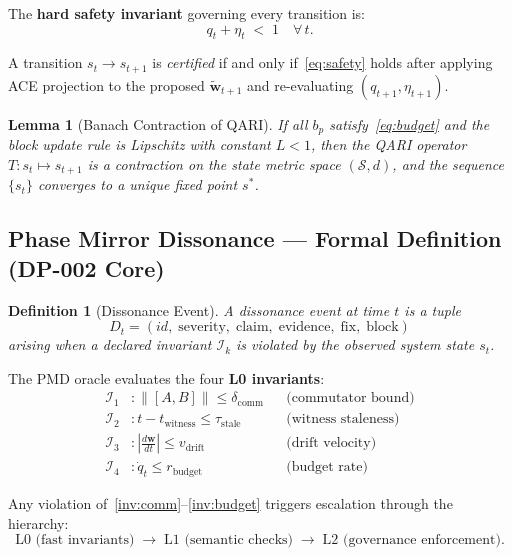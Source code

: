 \documentclass[12pt,letterpaper]{article}
\newtheorem{lemma}[theorem]{Lemma}
\newtheorem{definition}[theorem]{Definition}
\begin{document}
The \textbf{hard safety invariant} governing every transition is:
\begin{equation}
  q_t + \eta_t \;<\; 1 \quad \forall\, t. \label{eq:safety}
\end{equation}

A transition $s_t \to s_{t+1}$ is \emph{certified} if and only
if~\eqref{eq:safety} holds after applying ACE projection to the
proposed $\tilde{\mathbf{w}}_{t+1}$ and re-evaluating $(q_{t+1},\eta_{t+1})$.

\begin{lemma}[Banach Contraction of QARI]
If all $b_p$ satisfy~\eqref{eq:budget} and the block update rule is
Lipschitz with constant $L < 1$, then the QARI operator
$T: s_t \mapsto s_{t+1}$ is a contraction on the state metric space
$(\mathcal{S}, d)$, and the sequence $\{s_t\}$ converges to a unique
fixed point $s^*$.
\end{lemma}

\subsection{Phase Mirror Dissonance --- Formal Definition (DP-002 Core)}

\begin{definition}[Dissonance Event]
A \emph{dissonance event} at time $t$ is a tuple
\[
  D_t = (id,\; \text{severity},\; \text{claim},\; \text{evidence},\;
         \text{fix},\; \text{block})
\]
arising when a declared invariant $\mathcal{I}_k$ is violated by the
observed system state $s_t$.
\end{definition}

The PMD oracle evaluates the four \textbf{L0 invariants}:
\begin{align}
  \mathcal{I}_1 &: \|[A, B]\| \leq \delta_{\text{comm}}
    && \text{(commutator bound)} \label{inv:comm}\\
  \mathcal{I}_2 &: t - t_{\text{witness}} \leq \tau_{\text{stale}}
    && \text{(witness staleness)} \label{inv:stale}\\
  \mathcal{I}_3 &: \left|\frac{d\mathbf{w}}{dt}\right| \leq v_{\text{drift}}
    && \text{(drift velocity)} \label{inv:drift}\\
  \mathcal{I}_4 &: \dot{q}_t \leq r_{\text{budget}}
    && \text{(budget rate)} \label{inv:budget}
\end{align}

Any violation of~\eqref{inv:comm}--\eqref{inv:budget} triggers
escalation through the hierarchy:
\[
  \text{L0 (fast invariants)} \;\longrightarrow\;
  \text{L1 (semantic checks)} \;\longrightarrow\;
  \text{L2 (governance enforcement)}.
\]
\end{document}
